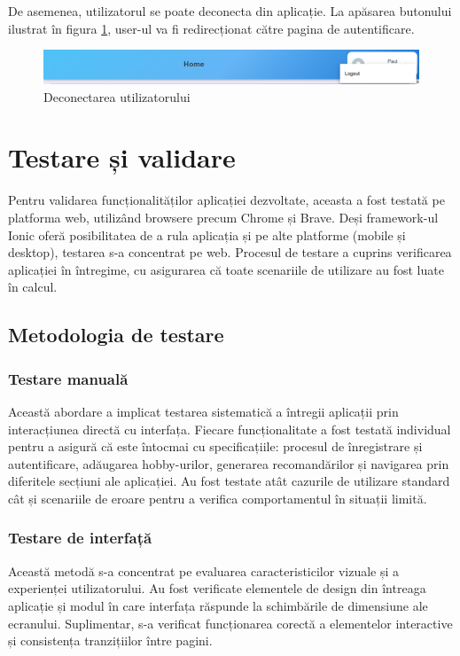 \par
De asemenea, utilizatorul se poate deconecta din aplicație. La apăsarea butonului ilustrat în figura \ref{FigLogoutButton}, user-ul va fi redirecționat către pagina de autentificare.

\begin{figure}[htbp]
	\centering
    \includegraphics[scale=0.35]{./figures/logout-component.png}
	\caption{Deconectarea utilizatorului}
	\label{FigLogoutButton}
\end{figure}

\section{Testare și validare}
\label{sec:ch4sec4}
Pentru validarea funcționalităților aplicației dezvoltate, aceasta a fost testată pe platforma web, utilizând browsere precum Chrome și Brave.
Deși framework-ul Ionic oferă posibilitatea de a rula aplicația și pe alte platforme (mobile și desktop), testarea s-a concentrat pe web.
Procesul de testare a cuprins verificarea aplicației în întregime, cu asigurarea că toate scenariile de utilizare au fost luate în calcul. 

\subsection{Metodologia de testare}
\label{subsec:ch4sec2sub1}
\subsubsection*{Testare manuală}
Această abordare a implicat testarea sistematică a întregii aplicații prin interacțiunea directă cu interfața.
Fiecare funcționalitate a fost testată individual pentru a asigură că este întocmai cu specificațiile: procesul de înregistrare și autentificare, adăugarea hobby-urilor, generarea recomandărilor și navigarea prin diferitele secțiuni ale aplicației.
Au fost testate atât cazurile de utilizare standard cât și scenariile de eroare pentru a verifica comportamentul în situații limită.
\subsubsection*{Testare de interfață}
Această metodă s-a concentrat pe evaluarea caracteristicilor vizuale și a experienței utilizatorului.
Au fost verificate elementele de design din întreaga aplicație și modul în care interfața răspunde la schimbările de dimensiune ale ecranului.
Suplimentar, s-a verificat funcționarea corectă a elementelor interactive și consistența tranzițiilor între pagini.

